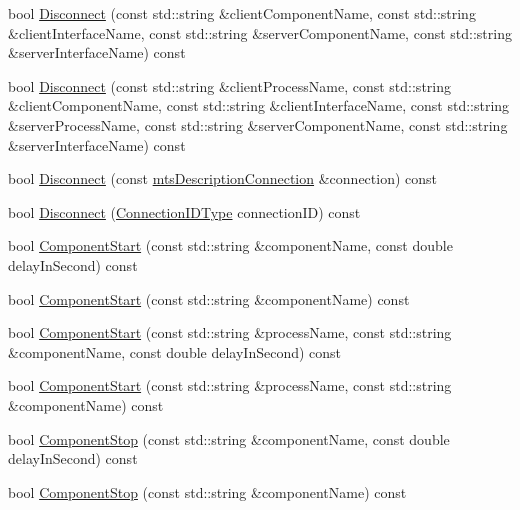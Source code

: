\begin{DoxyCompactItemize}
\item 
bool \hyperlink{classmts_manager_component_services_af34ce4e333b67f2b93e86faae7892016}{Disconnect} (const std\-::string \&client\-Component\-Name, const std\-::string \&client\-Interface\-Name, const std\-::string \&server\-Component\-Name, const std\-::string \&server\-Interface\-Name) const 
\item 
bool \hyperlink{classmts_manager_component_services_ab3cac9ae1df0551fd62051bd8f5427d8}{Disconnect} (const std\-::string \&client\-Process\-Name, const std\-::string \&client\-Component\-Name, const std\-::string \&client\-Interface\-Name, const std\-::string \&server\-Process\-Name, const std\-::string \&server\-Component\-Name, const std\-::string \&server\-Interface\-Name) const 
\item 
bool \hyperlink{classmts_manager_component_services_add7c94f89a97fd91c5583982ff3a798e}{Disconnect} (const \hyperlink{classmts_description_connection}{mts\-Description\-Connection} \&connection) const 
\item 
bool \hyperlink{classmts_manager_component_services_a3802bce7e028c69a34111ecff65a10e5}{Disconnect} (\hyperlink{mts_forward_declarations_8h_ad3543bb11742e1766374ec96016d6547}{Connection\-I\-D\-Type} connection\-I\-D) const 
\item 
bool \hyperlink{classmts_manager_component_services_ad45767eb085ebfc86cb592fc9023f957}{Component\-Start} (const std\-::string \&component\-Name, const double delay\-In\-Second) const 
\item 
bool \hyperlink{classmts_manager_component_services_a8bb81f817f3a1389f0bbbc4d9807f8bf}{Component\-Start} (const std\-::string \&component\-Name) const 
\item 
bool \hyperlink{classmts_manager_component_services_a4721c9a1743b1fdaf7ce8fd2df0b4de5}{Component\-Start} (const std\-::string \&process\-Name, const std\-::string \&component\-Name, const double delay\-In\-Second) const 
\item 
bool \hyperlink{classmts_manager_component_services_afb90c3acef87baf6a63b3b164bdbfaf5}{Component\-Start} (const std\-::string \&process\-Name, const std\-::string \&component\-Name) const 
\item 
bool \hyperlink{classmts_manager_component_services_a6ff15a84a392361eb15eeb5f2b1a8534}{Component\-Stop} (const std\-::string \&component\-Name, const double delay\-In\-Second) const 
\item 
bool \hyperlink{classmts_manager_component_services_a88a3a6973b09552462a6a776522bfb8f}{Component\-Stop} (const std\-::string \&component\-Name) const 

\end{DoxyCompactItemize}
